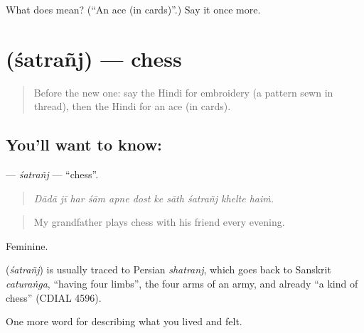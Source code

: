\begin{tcolorbox}[breakable,colback=teal!4,colframe=teal!35!black,title={Before you move on}]
What does  mean? (\textquotedblleft{}An ace (in cards)\textquotedblright{}.) Say it once more.
\end{tcolorbox}
\section[\texorpdfstring{\hi{शतरंज} (śatrañj)}{शतरंज (śatrañj)}]{ (śatrañj) — chess}

\label{lesson:HI-C526-satranj}



\begin{quote}
Before the new one: say the Hindi for embroidery (a pattern sewn in thread), then the Hindi for an ace (in cards).
\end{quote}

\subsection*{You'll want to know: }
\textbf{} — \emph{śatrañj} — \textquotedblleft{}chess\textquotedblright{}.

\begin{quote}
          
\end{quote}

\begin{quote}
\emph{Dādā jī har śām apne dost ke sāth śatrañj khelte haiṁ.}
\end{quote}

\begin{quote}
My grandfather plays chess with his friend every evening.
\end{quote}

Feminine.

\begin{cousinweb}
\textbf{} (\emph{śatrañj}) is usually traced to Persian \emph{shatranj}, which goes back to Sanskrit \emph{caturaṅga}, \textquotedblleft{}having four limbs\textquotedblright{}, the four arms of an army, and already \textquotedblleft{}a kind of chess\textquotedblright{} (CDIAL 4596).
\end{cousinweb}

\begin{grammarlens}[title={What you've built}]
One more word for describing what you lived and felt.
\end{grammarlens}

